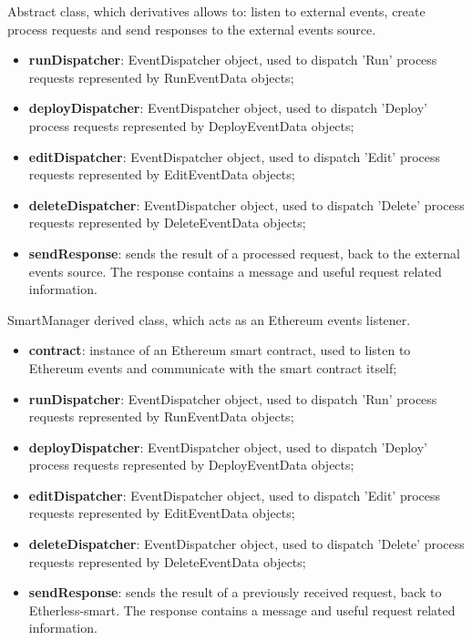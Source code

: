 	Abstract class, which derivatives allows to: listen to external events, create process requests and send responses to the external events source.
	\begin{itemize}
		\item \textbf{runDispatcher}: EventDispatcher object, used to dispatch 'Run' process requests represented by RunEventData objects;
		\item \textbf{deployDispatcher}: EventDispatcher object, used to dispatch 'Deploy' process requests represented by DeployEventData objects;
		\item \textbf{editDispatcher}: EventDispatcher object, used to dispatch 'Edit' process requests represented by EditEventData objects;
		\item \textbf{deleteDispatcher}: EventDispatcher object, used to dispatch 'Delete' process requests represented by DeleteEventData objects;
	\end{itemize}
	\begin{itemize}
		\item \textbf{sendResponse}: sends the result of a processed request, back to the external events source. The response contains a message and useful request related information.
	\end{itemize}
	SmartManager derived class, which acts as an Ethereum events listener.
	\begin{itemize}
		\item \textbf{contract}: instance of an Ethereum smart contract, used to listen to Ethereum events and communicate with the smart contract itself;
		\item \textbf{runDispatcher}: EventDispatcher object, used to dispatch 'Run' process requests represented by RunEventData objects;
		\item \textbf{deployDispatcher}: EventDispatcher object, used to dispatch 'Deploy' process requests represented by DeployEventData objects;
		\item \textbf{editDispatcher}: EventDispatcher object, used to dispatch 'Edit' process requests represented by EditEventData objects;
		\item \textbf{deleteDispatcher}: EventDispatcher object, used to dispatch 'Delete' process requests represented by DeleteEventData objects;
	\end{itemize}
	\begin{itemize}
		\item \textbf{sendResponse}: sends the result of a previously received request, back to Etherless-smart. The response contains a message and useful request related information.
	\end{itemize}
	
